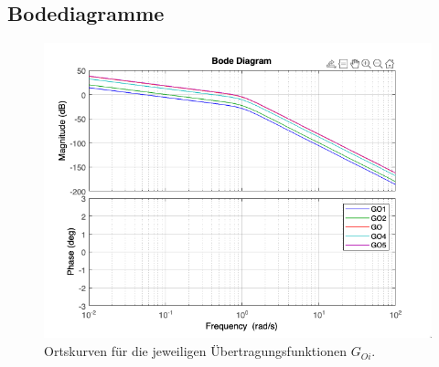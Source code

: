 \documentclass{article}
\begin{document}
		\subsection{Bodediagramme}
			\begin{figure}[h]
			    \includegraphics[scale=0.7, center]{./Bodediagramme_4_e.png}
			    \caption{Ortskurven für die jeweiligen Übertragungsfunktionen $G_{Oi}$.}
			    \label{fig:label}
			\end{figure}
\newpage
\end{document}
